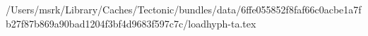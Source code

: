 /Users/msrk/Library/Caches/Tectonic/bundles/data/6ffe055852f8faf66c0acbe1a7fb27f87b869a90bad1204f3bf4d9683f597c7c/loadhyph-ta.tex